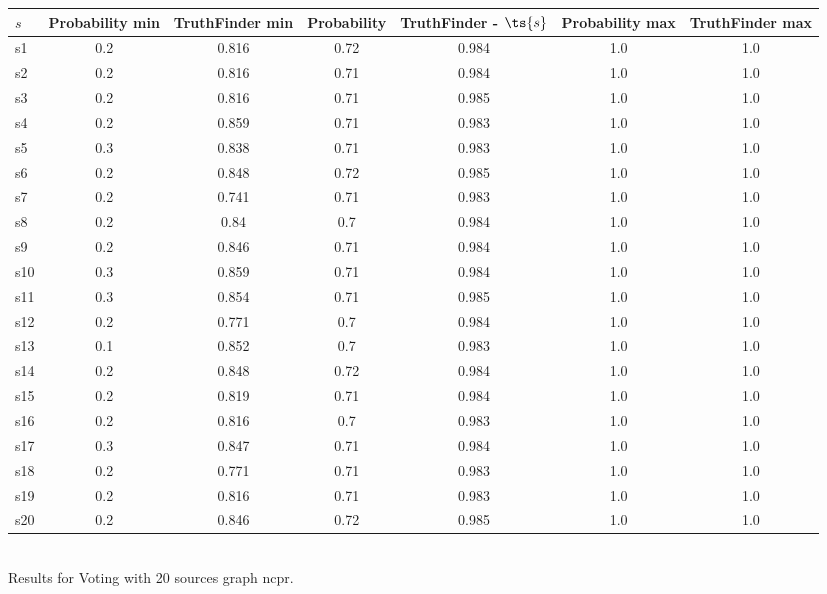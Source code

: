 \documentclass{article}
\begin{document}
\noindent\begin{tabular}{|l|c|c|c|c|c|c|}
\hline
$s$& Probability min & TruthFinder min & Probability & TruthFinder - $\ts{s}$ & Probability max & TruthFinder max\\
\hline
s1 &0.2 & 0.816 & 0.72 & 0.984 & 1.0 & 1.0\\
\hline
s2 &0.2 & 0.816 & 0.71 & 0.984 & 1.0 & 1.0\\
\hline
s3 &0.2 & 0.816 & 0.71 & 0.985 & 1.0 & 1.0\\
\hline
s4 &0.2 & 0.859 & 0.71 & 0.983 & 1.0 & 1.0\\
\hline
s5 &0.3 & 0.838 & 0.71 & 0.983 & 1.0 & 1.0\\
\hline
s6 &0.2 & 0.848 & 0.72 & 0.985 & 1.0 & 1.0\\
\hline
s7 &0.2 & 0.741 & 0.71 & 0.983 & 1.0 & 1.0\\
\hline
s8 &0.2 & 0.84 & 0.7 & 0.984 & 1.0 & 1.0\\
\hline
s9 &0.2 & 0.846 & 0.71 & 0.984 & 1.0 & 1.0\\
\hline
s10 &0.3 & 0.859 & 0.71 & 0.984 & 1.0 & 1.0\\
\hline
s11 &0.3 & 0.854 & 0.71 & 0.985 & 1.0 & 1.0\\
\hline
s12 &0.2 & 0.771 & 0.7 & 0.984 & 1.0 & 1.0\\
\hline
s13 &0.1 & 0.852 & 0.7 & 0.983 & 1.0 & 1.0\\
\hline
s14 &0.2 & 0.848 & 0.72 & 0.984 & 1.0 & 1.0\\
\hline
s15 &0.2 & 0.819 & 0.71 & 0.984 & 1.0 & 1.0\\
\hline
s16 &0.2 & 0.816 & 0.7 & 0.983 & 1.0 & 1.0\\
\hline
s17 &0.3 & 0.847 & 0.71 & 0.984 & 1.0 & 1.0\\
\hline
s18 &0.2 & 0.771 & 0.71 & 0.983 & 1.0 & 1.0\\
\hline
s19 &0.2 & 0.816 & 0.71 & 0.983 & 1.0 & 1.0\\
\hline
s20 &0.2 & 0.846 & 0.72 & 0.985 & 1.0 & 1.0\\
\hline
\end{tabular}\\

\noindent Results for Voting with 20 sources graph ncpr.
\end{document}
